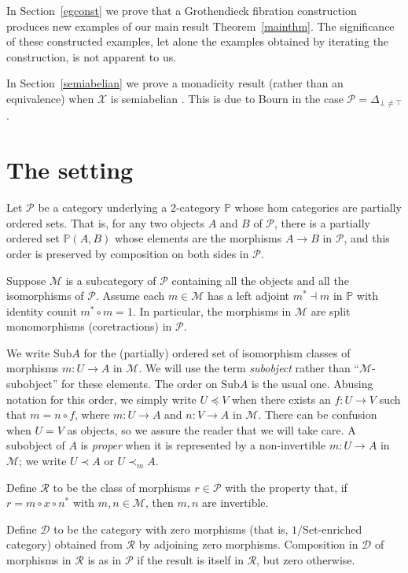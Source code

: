 \documentclass[a4paper,12pt,reqno]{amsart}
\theoremstyle{definition}
\theoremstyle{fact}
\theoremstyle{genquest}
\theoremstyle{step}
\newcommand{\ra}{\rightarrow}
\def\CD{{\mathscr D}}
\def\CM{{\mathscr M}}
\def\CP{{\mathscr P}}
\def\CR{{\mathscr R}}
\def\CX{{\mathscr X}}
\begin{document}
In Section~\ref{egconst} we prove that a Grothendieck fibration construction produces
new examples of our main result Theorem~\ref{mainthm}. The significance of these
constructed examples, let alone the examples obtained by iterating the construction, 
is not apparent to us. 

In Section~\ref{semiabelian} we prove a monadicity result (rather than an equivalence)
when $\CX$ is semiabelian \cite{JMT}. This is due to Bourn \cite{Bourn07} in the case
$\CP = \Delta_{\bot \neq \top}$.

\section{The setting}\label{setting}

Let $\CP$ be a category underlying a 2-category $\mathbb{P}$ whose hom
categories are partially ordered sets. That is, for any two objects $A$ and $B$
of $\CP$, there is a partially ordered set $\mathbb{P}(A,B)$ whose elements
are the morphisms $A\ra B$ in $\CP$, and this order is preserved by composition
on both sides in $\CP$.  

Suppose $\CM$ is a subcategory of $\CP$ containing all the objects and all the isomorphisms of $\CP$. Assume each $m\in \CM$ has a left adjoint 
$m^* \dashv m$ in $\mathbb{P}$ with identity counit $m^*\circ m=1$.
In particular, the morphisms in $\CM$ are split monomorphisms (coretractions)
in $\CP$. 

We write $\mathrm{Sub}A$ for the (partially) ordered set of isomorphism 
classes of morphisms
$m:U\ra A$ in $\CM$. We will use the term {\em subobject} 
rather than ``$\CM$-subobject'' for these elements. 
The order on $\mathrm{Sub}A$ is the usual one. 
Abusing notation for this order, we simply write $U\preceq V$ when there 
exists an $f : U\ra V$ such that $m=n\circ f$, where $m:U\ra A$ and $n:V\ra A$ in $\CM$. 
There can be confusion when $U=V$ as objects, so we assure the reader that we will take care.
A subobject of $A$ is {\em proper} when it is represented by a non-invertible $m:U\ra A$
in $\CM$; we write $U\prec A$ or $U\prec_m A$. 

Define $\CR$ to be the class of morphisms $r\in \CP$ with the property that, if $r = m\circ x \circ n^*$ with $m, n \in \CM$, then $m, n$ are invertible. 

Define $\CD$ to be the category with zero morphisms (that is, $1/\mathrm{Set}$-enriched
category) obtained from $\CR$ by adjoining zero morphisms.
Composition in $\CD$ of morphisms in $\CR$ is as in $\CP$ if the result is itself
in $\CR$, but zero otherwise. 
\end{document}
